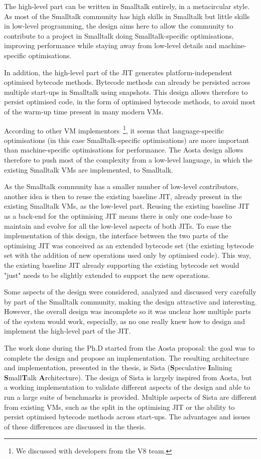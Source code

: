 \documentclass[a4paper,12pt,twoside]{../includes/ThesisStyle}
\begin{document}
The high-level part can be written in Smalltalk entirely, in a metacircular style. As most of the Smalltalk community has high skills in Smalltalk but little skills in low-level programming, the design aims here to allow the community to contribute to a project in Smalltalk doing Smalltalk-specific optimisations, improving performance while staying away from low-level details and machine-specific optimisations. 

In addition, the high-level part of the JIT generates platform-independent optimised bytecode methods. Bytecode methods can already be persisted across multiple start-ups in Smalltalk using snapshots. This design allows therefore to persist optimised code, in the form of optimised bytecode methods, to avoid most of the warm-up time present in many modern VMs.

According to other VM implementors~\footnote{We discussed with developers from the V8 team.}, it seems that language-specific optimisations (in this case Smalltalk-specific optimisations) are more important than machine-specific optimisations for performance. The Aosta design allows therefore to push most of the complexity from a low-level language, in which the existing Smalltalk VMs are implemented, to Smalltalk.

As the Smalltalk community has a smaller number of low-level contributors, another idea is then to reuse the existing baseline JIT, already present in the existing Smalltalk VMs, as the low-level part. Reusing the existing baseline JIT as a back-end for the optimising JIT means there is only one code-base to maintain and evolve for all the low-level aspects of both JITs. To ease the implementation of this design, the interface between the two parts of the optimising JIT was conceived as an extended bytecode set (the existing bytecode set with the addition of new operations used only by optimised code). This way, the existing baseline JIT already supporting the existing bytecode set would "just" needs to be slightly extended to support the new operations.

Some aspects of the design were considered, analyzed and discussed very carefully by part of the Smalltalk community, making the design attractive and interesting. However, the overall design was incomplete so it was unclear how multiple parts of the system would work, especially, as no one really knew how to design and implement the high-level part of the JIT.

The work done during the Ph.D started from the Aosta proposal: the goal was to complete the design and propose an implementation. The resulting architecture and implementation, presented in the thesis, is Sista (\textbf{S}peculative \textbf{I}nlining \textbf{S}mall\textbf{T}alk \textbf{A}rchitecture). The design of Sista is largely inspired from Aosta, but a working implementation to validate different aspects of the design and able to run a large suite of benchmarks is provided. Multiple aspects of Sista are different from existing VMs, such as the split in the optimising JIT or the ability to persist optimised bytecode methods across start-ups. The advantages and issues of these differences are discussed in the thesis.
\end{document}
